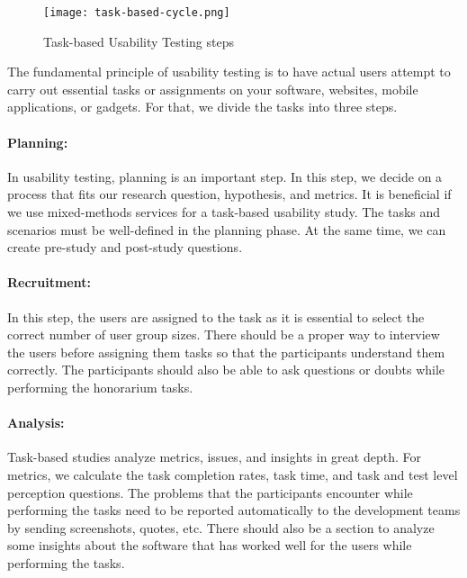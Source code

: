 \begin{figure}[htbp!]
  \centering    
  \texttt{[image: task-based-cycle.png]}
  \caption[Tasks steps]{Task-based Usability Testing steps}
  \label{fig:background:taskssteps}
\end{figure}
The fundamental principle of usability testing is to have actual users attempt to carry out essential tasks or assignments on your software, websites, mobile applications, or gadgets.
For that, we divide the tasks into three steps.
\paragraph{Planning:}
In usability testing, planning is an important step. 
In this step, we decide on a process that fits our research question, hypothesis, and metrics.  
It is beneficial if we use mixed-methods services for a task-based usability study.
The tasks and scenarios must be well-defined in the planning phase. At the same time, we can create pre-study and post-study questions. 
\paragraph{Recruitment:} 
In this step, the users are assigned to the task as it is essential to select the correct number of user group sizes.
There should be a proper way to interview the users before assigning them tasks so that the participants understand them correctly. 
The participants should also be able to ask questions or doubts while performing the honorarium tasks. 
\paragraph{Analysis:}
Task-based studies analyze metrics, issues, and insights in great depth.
For metrics, we calculate the task completion rates, task time, and task and test level perception questions.
The problems that the participants encounter while performing the tasks need to be reported automatically to the development teams by sending screenshots, quotes, etc. 
There should also be a section to analyze some insights about the software that has worked well for the users while performing the tasks.
\clearpage

